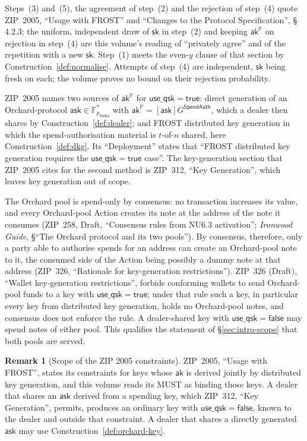 \documentclass[11pt,a4paper]{article}
\theoremstyle{definition}
\newtheorem{remark}[theorem]{Remark}
\newcommand{\F}{\mathbb{F}}
\newcommand{\PP}{\mathbb{P}}
\newcommand{\Vesta}{\ensuremath{\mathsf{Vesta}}}
\newcommand{\ask}{\ensuremath{\mathsf{ask}}}
\newcommand{\aksym}{\ensuremath{\mathsf{ak}}}
\begin{document}
Steps~(3) and~(5), the agreement of step~(2) and the rejection of step~(4)
quote ZIP~2005, ``Usage with FROST'' and ``Changes to the Protocol
Specification'', \S\,4.2.3; the uniform, independent draw of
\(\mathsf{sk}\) in step~(2) and keeping \(\aksym^{\PP}\) on rejection in
step~(4) are this volume's reading of ``privately agree'' and of the
repetition with a new \(\mathsf{sk}\). Step~(1) meets the even-\(y\)
clause of that section by Construction~\ref{def:normalise}. Attempts of
step~(4) are independent, \(\mathsf{sk}\) being fresh on each; the volume
proves no bound on their rejection probability.

ZIP~2005 names two sources of \(\aksym^{\PP}\) for
\(\mathsf{use\_qsk} = \mathsf{true}\): direct generation of an
Orchard-protocol \(\ask \in \F^{*}_{p_{\Vesta}}\) with
\(\aksym^{\PP} = [\ask]G^{\mathsf{SpendAuth}}\), which a dealer then shares
by Construction~\ref{def:dealer}; and FROST distributed key generation in
which the spend-authorisation material is \(t\)-of-\(n\) shared, here
Construction~\ref{def:dkg}. Its ``Deployment'' states that ``FROST
distributed key generation requires the \(\mathsf{use\_qsk} =
\mathsf{true}\) case''. The key-generation section that ZIP~2005 cites for
the second method is ZIP~312, ``Key Generation'', which leaves key
generation out of scope.

The Orchard pool is spend-only by consensus: no transaction increases its
value, and every Orchard-pool Action creates its note at the address of the
note it consumes (ZIP~258, Draft, ``Consensus rules from NU6.3 activation'';
\emph{Ironwood Guide}, \S``The Orchard protocol and its two pools''). By
consensus, therefore, only a party able to authorise spends for an address
can create an Orchard-pool note to it, the consumed side of the Action being
possibly a dummy note at that address (ZIP~326, ``Rationale for
key-generation restrictions''). ZIP~326 (Draft), ``Wallet key-generation
restrictions'', forbids conforming wallets to send Orchard-pool funds to a
key with \(\mathsf{use\_qsk} = \mathsf{true}\); under that rule such a key,
in particular every key from distributed key generation, holds no
Orchard-pool notes, and consensus does not enforce the rule. A dealer-shared
key with \(\mathsf{use\_qsk} = \mathsf{false}\) may spend notes of either
pool. This qualifies the statement of \S\ref{sec:intro-scope} that both
pools are served.

\begin{remark}[Scope of the ZIP 2005 constraints]\label{rem:zip2005-scope}
ZIP~2005, ``Usage with FROST'', states its constraints for keys whose
\(\aksym\) is derived jointly by distributed key generation, and this volume
reads its MUST as binding those keys. A dealer that shares an \(\ask\)
derived from a spending key, which ZIP~312, ``Key Generation'', permits,
produces an ordinary key with \(\mathsf{use\_qsk} = \mathsf{false}\), known
to the dealer and outside that constraint. A dealer that shares a directly
generated \(\ask\) may use Construction~\ref{def:orchard-key}.
\end{remark}
\end{document}
